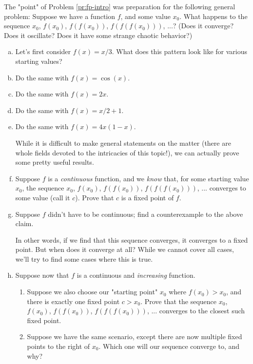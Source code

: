 \begin{problem}
\label{pr:fp-iter}


The "point" of Problem \ref{pr:fp-intro} was preparation for the following general problem: Suppose we have a function $f$, and some value $x_0$. What happens to the sequence $x_0$, $f(x_0)$, $f(f(x_0))$, $f(f(f(x_0)))$, ...? (Does it converge? Does it oscillate? Does it have some strange chaotic behavior?)

\begin{enumerate}[(a)]
\item Let's first consider $f(x) = x/3$. What does this pattern look like for various starting values?
\item Do the same with $f(x) = \cos(x)$.
\item Do the same with $f(x) = 2x$. 
\item Do the same with $f(x) = x/2 + 1$. 
\item Do the same with $f(x) = 4x(1-x)$. %

While it is difficult to make general statements on the matter (there are whole fields devoted to the intricacies of this topic!), we can actually prove some pretty useful results.


\item Suppose $f$ is a \emph{continuous} function, and we \emph{know} that, for some starting value $x_0$, the sequence $x_0$, $f(x_0)$, $f(f(x_0))$, $f(f(f(x_0)))$, ... converges to some value (call it $c$). Prove that $c$ is a fixed point of $f$.
\item Suppose $f$ didn't have to be continuous; find a counterexample to the above claim.

In other words, if we find that this sequence converges, it converges to a fixed point. But when does it converge at all? While we cannot cover all cases, we'll try to find some cases where this is true.


\item Suppose now that $f$ is a continuous and \emph{increasing} function. 
\begin{enumerate}[i]
\item Suppose we also choose our "starting point" $x_0$ where $f(x_0) > x_0$, and there is exactly one fixed point $c > x_0$. Prove that the sequence $x_0$, $f(x_0)$, $f(f(x_0))$, $f(f(f(x_0)))$, ... converges to the closest such fixed point. 
\item Suppose we have the same scenario, except there are now multiple fixed points to the right of $x_0$. Which one will our sequence converge to, and why?
\end{enumerate}


\end{enumerate}
\end{problem}
